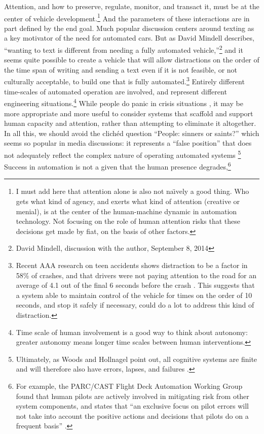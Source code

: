 Attention, and how to preserve, regulate, monitor, and transact it,
must be at the center of vehicle development.\footnote{I must add here
that attention alone is also not na\"{\i}vely a good thing. Who gets what
kind of agency, and exerts what kind of attention (creative or menial), is at the center of
the human-machine dynamic in automation technology. Not focusing on
the role of human attention risks that these decisions get made
by fiat, on the basis of other factors.} And the parameters of
these interactions are in part defined by the end goal. Much popular
discussion centers around texting as a key motivator of the need for
automated cars. But as 
David Mindell describes, ``wanting to text is different
from needing a fully automated vehicle,''\footnote{David Mindell,
  discussion with the author, September 8, 2014} and it seems quite possible
to create a vehicle that will allow distractions on the order of the
time span of writing and sending a text even if it is not feasible, or
not culturally acceptable, to build one that is fully
automated.\footnote{Recent AAA research on teen accidents shows
  distraction to be a factor in 58\% of crashes, and that drivers were
not paying attention to the road for an average of 4.1 out of the
final 6 seconds before the crash \cite{greenDistraction}. This
suggests that a system able to 
maintain control of the vehicle for times on the order of 10 seconds,
and stop it safely if necessary, could do a lot to address this kind
of distraction.} Entirely different time-scales of automated operation
are involved, and represent different engineering
situations.\footnote{Time scale of human involvement is a good way to
  think about autonomy: greater autonomy means longer time scales
  between human interventions.} While
people do panic in crisis situations \cite{wiseFear},
it may be more appropriate and more useful to consider systems 
that scaffold and support human capacity and attention, rather than
attempting to eliminate it altogether. In
all this, we should avoid the clich\'{e}d question ``People: sinners
or saints?'' which seems so popular in media discussions: it represents
a ``false position'' that does not adequately reflect the complex
nature of operating automated
systems \cite[p. 1]{woodshollnagel}\footnote{Ultimately, as Woods and
Hollnagel point out, all cognitive systems are finite and will
therefore also have errors, lapses, and
failures \cite[p. 1--2]{woodshollnagel}.} Success in automation is not
a given that the human presence degrades,\footnote{For example, the PARC/CAST Flight Deck Automation Working Group
found that human pilots are actively involved in mitigating risk from
other system components, and states that ``an exclusive focus on pilot
errors will not take into account the positive actions and decisions
that pilots do on a frequent basis'' \cite[p. 30]{PARCCAST}.}
